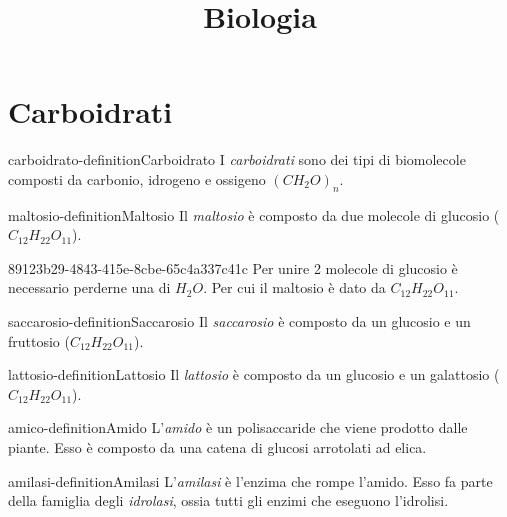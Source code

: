 \documentclass[preview]{standalone}
\begin{document}
\title{Biologia}
\genpage

\section{Carboidrati}

\begin{snippetdefinition}{carboidrato-definition}{Carboidrato}
    I \textit{carboidrati} sono dei tipi di biomolecole composti da carbonio, idrogeno e ossigeno
    \((CH_2O)_n\).
\end{snippetdefinition}


\begin{snippetdefinition}{maltosio-definition}{Maltosio}
    Il \textit{maltosio} è composto da due molecole di glucosio (\(C_{12}H_{22}O_{11}\)).
\end{snippetdefinition}

\begin{snippet}{89123b29-4843-415e-8cbe-65c4a337c41c}
    Per unire 2 molecole di glucosio
è necessario perderne una di \(H_2O\). Per cui il maltosio è dato da \(C_{12}H_{22}O_{11}\).
\end{snippet}

\begin{snippetdefinition}{saccarosio-definition}{Saccarosio}
    Il \textit{saccarosio} è composto da un glucosio e un fruttosio (\(C_{12}H_{22}O_{11}\)).
\end{snippetdefinition}

\begin{snippetdefinition}{lattosio-definition}{Lattosio}
    Il \textit{lattosio} è composto da un glucosio e un galattosio (\(C_{12}H_{22}O_{11}\)).
\end{snippetdefinition}


\begin{snippetdefinition}{amico-definition}{Amido}
    L'\textit{amido} è un polisaccaride che viene prodotto dalle piante.
    Esso è composto da una catena di glucosi arrotolati ad elica.
\end{snippetdefinition}

\begin{snippetdefinition}{amilasi-definition}{Amilasi}
    L'\textit{amilasi} è l'enzima che rompe l'amido.
    Esso fa parte della famiglia degli \textit{idrolasi}, ossia tutti gli enzimi che
    eseguono l'idrolisi.
\end{snippetdefinition}
\end{document}
